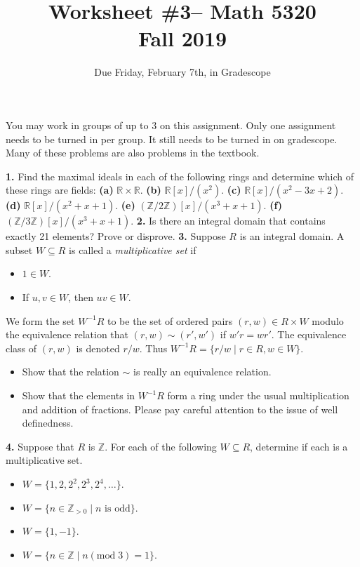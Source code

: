 \documentclass[10pt]{amsart}
\theoremstyle{theorem}
\newcommand{\bR}{{\mathbb{R}}}
\newcommand{\bZ}{\mathbb{Z}}
\begin{document}
\title{Worksheet \#3-- Math 5320\\Fall 2019}
\author{Due Friday, February 7th, in Gradescope}

\maketitle
You may work in groups of up to 3 on this assignment.  Only one assignment needs to be turned in per group.  It still needs to be turned in on gradescope.  Many of these problems are also problems in the textbook.

\noindent
{\bf 1.}  Find the maximal ideals in each of the following rings and determine which of these rings are fields:
\vskip 9pt
{\bf (a)}  $\bR \times \bR$.  \vskip 6pt
{\bf (b)}  $\bR[x]/(x^2)$.  \vskip 6pt
{\bf (c)}  $\bR[x]/(x^2 - 3x + 2)$.  \vskip 6pt
{\bf (d)}  $\bR[x]/(x^2 + x + 1)$.  \vskip 6pt
{\bf (e)}  $(\bZ/2\bZ)[x] / (x^3 + x + 1)$.  \vskip 6pt
{\bf (f)}  $(\bZ/3\bZ)[x] / (x^3 + x + 1)$.
\newpage
\noindent
{\bf 2.}  Is there an integral domain that contains exactly 21 elements?  Prove or disprove.
\newpage
\noindent
{\bf 3.}  Suppose $R$ is an integral domain.  A subset $W \subseteq R$ is called a \emph{multiplicative set} if 
\begin{itemize}
    \item[(a)]  $1 \in W$.
    \item[(b)]  If $u,v \in W$, then $uv \in W$.
\end{itemize} 
We form the set $W^{-1} R$ to be the set of ordered pairs $(r, w) \in R \times W$ modulo the equivalence relation that $(r, w) \sim (r', w')$ if $w'r = w r'$.  The equivalence class of $(r, w)$ is denoted $r/w$.  Thus $W^{-1}R = \{r/w \;|\; r \in R, w \in W\}$.  
\begin{itemize}
    \item[(a)]  Show that the relation $\sim$ is really an equivalence relation.
    \item[(b)]  Show that the elements in $W^{-1} R$ form a ring under the usual multiplication and addition of fractions.  Please pay careful attention to the issue of well definedness.
\end{itemize}
\newpage
\noindent
{\bf 4.}  Suppose that $R$ is $\bZ$.  For each of the following $W \subseteq R$, determine if each is a multiplicative set.
\begin{itemize}
    \item[(a)] $W = \{1, 2, 2^2, 2^3, 2^4, \dots\}$.
    \item[(b)] $W = \{n \in \bZ_{>0} \; |\; n \text{ is odd}\}$.
    \item[(c)] $W = \{ 1, -1\}$.
    \item[(d)] $W = \{ n \in \bZ \;|\; n (\text{mod}\;3) = 1 \}$.
\end{itemize}
\end{document}
